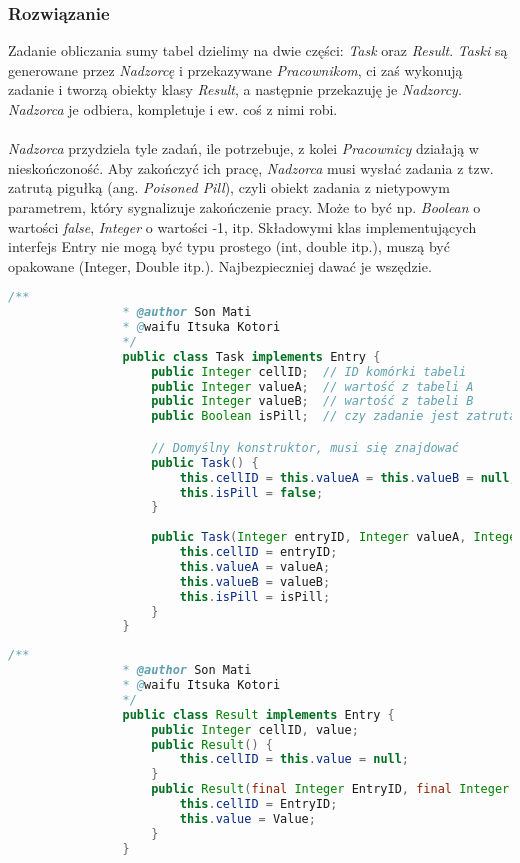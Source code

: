 		\subsubsection{Rozwiązanie}
			Zadanie obliczania sumy tabel dzielimy na dwie części: \textit{Task} oraz \textit{Result}. \textit{Taski} są generowane przez \textit{Nadzorcę} i przekazywane \textit{Pracownikom}, ci zaś wykonują zadanie i tworzą obiekty klasy \textit{Result}, a następnie przekazuję je \textit{Nadzorcy}. \textit{Nadzorca} je odbiera, kompletuje i ew. coś z nimi robi.\\\\
			\textit{Nadzorca} przydziela tyle zadań, ile potrzebuje, z kolei \textit{Pracownicy} działają w nieskończoność. Aby zakończyć ich pracę, \textit{Nadzorca} musi wysłać zadania z tzw. zatrutą pigułką (ang. \emph{Poisoned Pill}), czyli obiekt zadania z nietypowym parametrem, który sygnalizuje zakończenie pracy. Może to być np. \textit{Boolean} o wartości \textit{false}, \textit{Integer} o wartości -1, itp.
			Składowymi klas implementujących interfejs Entry nie mogą być typu prostego (int, double itp.), muszą być opakowane (Integer, Double itp.). Najbezpieczniej dawać je wszędzie.\\
			\begin{lstlisting}[language=Java]
				/**
				* @author Son Mati
				* @waifu Itsuka Kotori
				*/
				public class Task implements Entry {
					public Integer cellID;	// ID komórki tabeli
					public Integer valueA;	// wartość z tabeli A
					public Integer valueB;	// wartość z tabeli B
					public Boolean isPill;	// czy zadanie jest zatrutą pigułką

					// Domyślny konstruktor, musi się znajdować
					public Task() {
						this.cellID = this.valueA = this.valueB = null;
						this.isPill = false;
					}
					
					public Task(Integer entryID, Integer valueA, Integer valueB, Boolean isPill) {
						this.cellID = entryID;
						this.valueA = valueA;
						this.valueB = valueB;
						this.isPill = isPill;
					}
				}
			\end{lstlisting}
			\newpage
			\begin{lstlisting}[language=Java]
				/**
				* @author Son Mati
				* @waifu Itsuka Kotori
				*/
				public class Result implements Entry {
					public Integer cellID, value;
					public Result() {
						this.cellID = this.value = null;
					}
					public Result(final Integer EntryID, final Integer Value) {
						this.cellID = EntryID;
						this.value = Value;
					}
				}
			\end{lstlisting}
